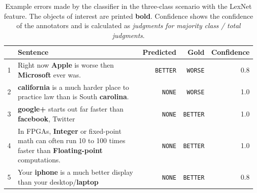 \begin{table}[htbp]
\caption{Example errors made by the classifier in the three-class scenario with the LexNet feature. The objects of interest are printed \textbf{bold}. Confidence shows the confidence of the annotators and is calculated as \emph{judgments for majority class / total judgments}.}
\label{tbl:3_mistakes_lexnet}
\begin{tabularx}{\linewidth}{lXrrr}
\toprule
 & Sentence & Predicted & Gold & Confidence \\ \midrule
1 & Right now \textbf{Apple} is worse then \textbf{Microsoft} ever was. & \texttt{BETTER} & \texttt{WORSE} & 0.8 \\ %

2 & \textbf{california} is a much harder place to practice law than is South \textbf{carolina}. & \texttt{NONE} & \texttt{WORSE} & 1.0\\ %

3 & \textbf{google+} starts out far faster than \textbf{facebook}, Twitter& \texttt{NONE} & \texttt{BETTER} & 1.0\\ %

4 & In FPGAs, \textbf{Integer} or fixed-point math can often run 10 to 100 times faster than \textbf{Floating-point} 
computations. & \texttt{NONE} & \texttt{BETTER} & 1.0\\ %

5 & Your \textbf{iphone} is a much better display than your desktop/\textbf{laptop} & \texttt{NONE} & \texttt{BETTER} & 0.8\\
 \bottomrule
\end{tabularx}
\end{table}

